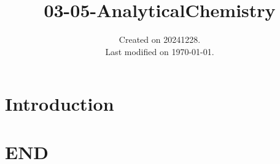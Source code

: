 \documentclass[UTF8]{../03-Chemistry}
\begin{document}
\title{03-05-AnalyticalChemistry}
\date{Created on 20241228.\\   Last modified on \today.}
\maketitle
\tableofcontents


\chapter{Introduction}





\chapter{END}
\end{document}
